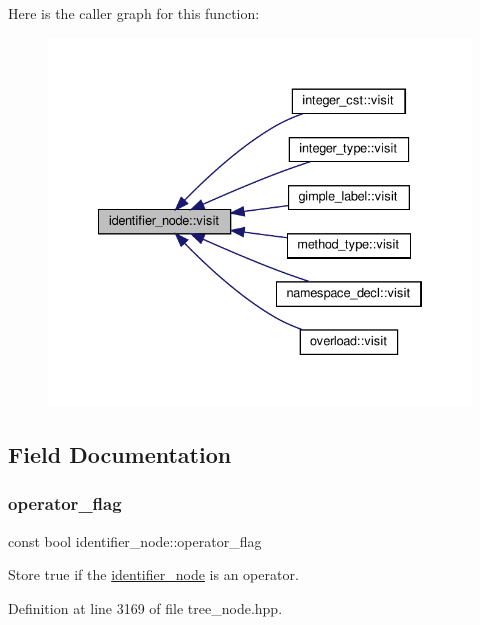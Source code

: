 Here is the caller graph for this function\+:
\nopagebreak
\begin{figure}[H]
\begin{center}
\leavevmode
\includegraphics[width=334pt]{df/d9e/structidentifier__node_ada49ca74d47b1db6e1dfa69a1a46d597_icgraph}
\end{center}
\end{figure}


\subsection{Field Documentation}
\mbox{\label{structidentifier__node_adab51691a41773a12f4aa9112203256f}} 
\subsubsection{\texorpdfstring{operator\+\_\+flag}{operator\_flag}}
{\footnotesize\ttfamily const bool identifier\+\_\+node\+::operator\+\_\+flag}



Store true if the \hyperlink{structidentifier__node}{identifier\+\_\+node} is an operator. 



Definition at line 3169 of file tree\+\_\+node.\+hpp.



